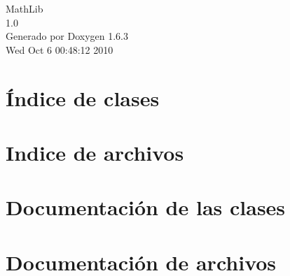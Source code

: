 \documentclass[a4paper]{book}
\begin{document}
\hypersetup{pageanchor=false}
\begin{titlepage}
\vspace*{7cm}
\begin{center}
{\Large MathLib \\[1ex]\large 1.0 }\\
\vspace*{1cm}
{\large Generado por Doxygen 1.6.3}\\
\vspace*{0.5cm}
{\small Wed Oct 6 00:48:12 2010}\\
\end{center}
\end{titlepage}
\clearemptydoublepage
{}
\tableofcontents
\clearemptydoublepage
{}
\hypersetup{pageanchor=true}
\chapter{Índice de clases}

\chapter{Indice de archivos}

\chapter{Documentación de las clases}








\chapter{Documentación de archivos}






















\printindex
\end{document}
